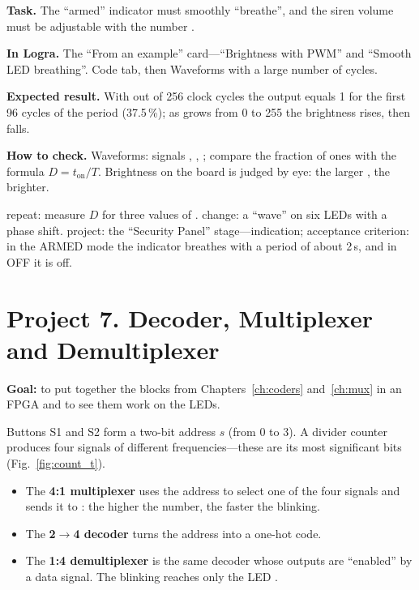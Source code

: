 \begin{diybox}
\textbf{Task.} The ``armed'' indicator must smoothly ``breathe'', and the siren volume must be adjustable with the number .

\textbf{In Logra.} The ``From an example'' card---``Brightness with PWM'' and ``Smooth LED breathing''. Code tab, then Waveforms with a large number of cycles.

\textbf{Expected result.} With  out of 256 clock cycles the output equals 1 for the first 96 cycles of the period (37.5\,\%); as  grows from 0 to 255 the brightness rises, then falls.

\textbf{How to check.} Waveforms: signals , , ; compare the fraction of ones with the formula $D=t_\text{on}/T$. Brightness on the board is judged by eye: the larger , the brighter.

 repeat: measure $D$ for three values of .  change: a ``wave'' on six LEDs with a phase shift.  project: the ``Security Panel'' stage---indication; acceptance criterion: in the ARMED mode the indicator breathes with a period of about 2\,s, and in OFF it is off.
\end{diybox}

\section{Project 7. Decoder, Multiplexer and Demultiplexer}

\textbf{Goal:} to put together the blocks from Chapters~\ref{ch:coders} and~\ref{ch:mux} in an FPGA and
to see them work on the LEDs.

Buttons S1 and S2 form a two-bit address $s$ (from 0 to 3). A divider counter
produces four signals of different frequencies---these are its most significant bits
(Fig.~\ref{fig:count_t}).
\begin{itemize}
  \item The \textbf{4:1 multiplexer} uses the address to select one of the four signals
        and sends it to : the higher the number, the faster the blinking.
  \item The \textbf{2$\to$4 decoder} turns the address into a one-hot code.
  \item The \textbf{1:4 demultiplexer} is the same decoder whose
        outputs are ``enabled'' by a data signal. The blinking reaches only
        the LED .
\end{itemize}

